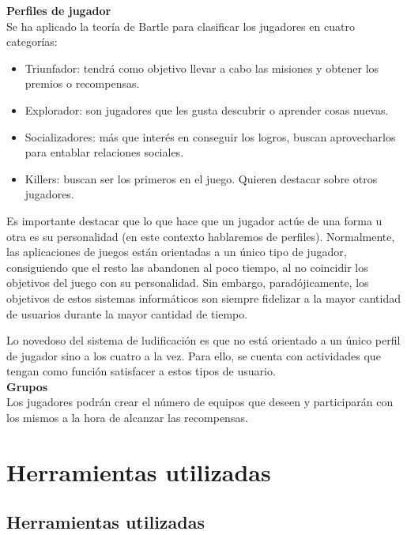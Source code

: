 \documentclass[twoside]{report}
\begin{document}
\textbf{Perfiles de jugador\cite{iebsctj}}\\ 

Se ha aplicado la teoría de Bartle\cite{iebsctj} para clasificar los jugadores en cuatro categorías:
\begin{itemize}

\item Triunfador: tendrá como objetivo llevar a cabo las misiones y obtener los premios o recompensas.
\item Explorador: son jugadores que les gusta descubrir o aprender cosas nuevas.
\item Socializadores: más que interés en conseguir los logros, buscan aprovecharlos para entablar relaciones sociales.
\item Killers: buscan ser los primeros en el juego. Quieren destacar sobre otros jugadores.

\end{itemize}

Es importante destacar que lo que hace que un jugador actúe de una forma u otra es su personalidad (en este contexto hablaremos de perfiles). Normalmente, las aplicaciones de juegos están orientadas a un único tipo de jugador, consiguiendo que el resto las abandonen al poco tiempo, al no coincidir los objetivos del juego con su personalidad. Sin embargo, paradójicamente, los objetivos de estos sistemas informáticos son siempre fidelizar a la mayor cantidad de usuarios durante la mayor cantidad de tiempo.

Lo novedoso del sistema de ludificación es que no está orientado a un único perfil de jugador sino a los cuatro a la vez. Para ello, se cuenta con actividades que tengan como función satisfacer a estos tipos de usuario. \\

\textbf{Grupos}\\

Los jugadores podrán crear el número de equipos que deseen y participarán con los mismos a la hora de alcanzar las recompensas.

\chapter{Herramientas utilizadas}
\section{Herramientas utilizadas}
\end{document}
